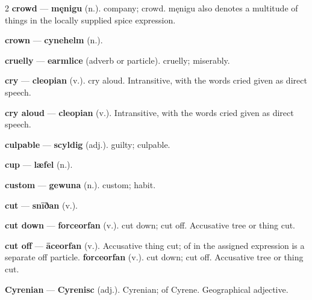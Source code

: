 \begin{multicols}{2}
\textbf{crowd} — \textbf{męnigu} (n.). company; crowd. męnigu also denotes a multitude of things in the locally supplied spice expression.\par
\textbf{crown} — \textbf{cynehelm} (n.).\par
\textbf{cruelly} — \textbf{earmlice} (adverb or particle). cruelly; miserably.\par
\textbf{cry} — \textbf{cleopian} (v.). cry aloud. Intransitive, with the words cried given as direct speech.\par
\textbf{cry aloud} — \textbf{cleopian} (v.). Intransitive, with the words cried given as direct speech.\par
\textbf{culpable} — \textbf{scyldig} (adj.). guilty; culpable.\par
\textbf{cup} — \textbf{læfel} (n.).\par
\textbf{custom} — \textbf{gewuna} (n.). custom; habit.\par
\textbf{cut} — \textbf{snīðan} (v.).\par
\textbf{cut down} — \textbf{forceorfan} (v.). cut down; cut off. Accusative tree or thing cut.\par
\textbf{cut off} — \textbf{āceorfan} (v.). Accusative thing cut; of in the assigned expression is a separate off particle. \textbf{forceorfan} (v.). cut down; cut off. Accusative tree or thing cut.\par
\textbf{Cyrenian} — \textbf{Cyrenisc} (adj.). Cyrenian; of Cyrene. Geographical adjective.\par

\end{multicols}
